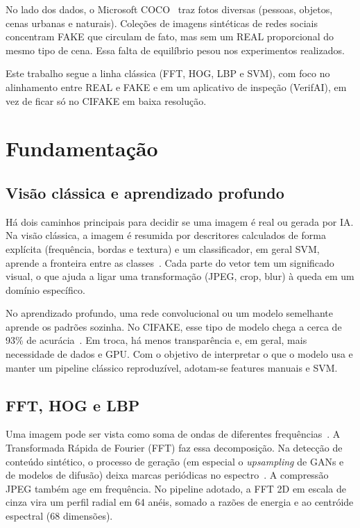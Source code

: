 \documentclass[12pt]{article}
\begin{document}
No lado dos dados, o Microsoft COCO~\cite{coco2017} traz fotos diversas (pessoas, objetos, cenas urbanas e naturais). Coleções de imagens sintéticas de redes sociais~\cite{harvardAIGI} concentram FAKE que circulam de fato, mas sem um REAL proporcional do mesmo tipo de cena. Essa falta de equilíbrio pesou nos experimentos realizados.

Este trabalho segue a linha clássica (FFT, HOG, LBP e SVM), com foco no alinhamento entre REAL e FAKE e em um aplicativo de inspeção (VerifAI), em vez de ficar só no CIFAKE em baixa resolução.

\section{Fundamentação}
\label{sec:fundamentacao}

\subsection{Visão clássica e aprendizado profundo}

Há dois caminhos principais para decidir se uma imagem é real ou gerada por IA. Na visão clássica, a imagem é resumida por descritores calculados de forma explícita (frequência, bordas e textura) e um classificador, em geral SVM, aprende a fronteira entre as classes~\cite{gonzalez2018,nirob2026handcrafted}. Cada parte do vetor tem um significado visual, o que ajuda a ligar uma transformação (JPEG, crop, blur) à queda em um domínio específico.

No aprendizado profundo, uma rede convolucional ou um modelo semelhante aprende os padrões sozinha. No CIFAKE, esse tipo de modelo chega a cerca de 93\% de acurácia~\cite{bird2024cifake}. Em troca, há menos transparência e, em geral, mais necessidade de dados e GPU. Com o objetivo de interpretar o que o modelo usa e manter um pipeline clássico reproduzível, adotam-se features manuais e SVM.

\subsection{FFT, HOG e LBP}

Uma imagem pode ser vista como soma de ondas de diferentes frequências~\cite{gonzalez2018}. A Transformada Rápida de Fourier (FFT) faz essa decomposição. Na detecção de conteúdo sintético, o processo de geração (em especial o \emph{upsampling} de GANs e de modelos de difusão) deixa marcas periódicas no espectro~\cite{frank2020frequency,bammey2024synthbuster}. A compressão JPEG também age em frequência. No pipeline adotado, a FFT 2D em escala de cinza vira um perfil radial em 64 anéis, somado a razões de energia e ao centróide espectral (68 dimensões).
\end{document}
